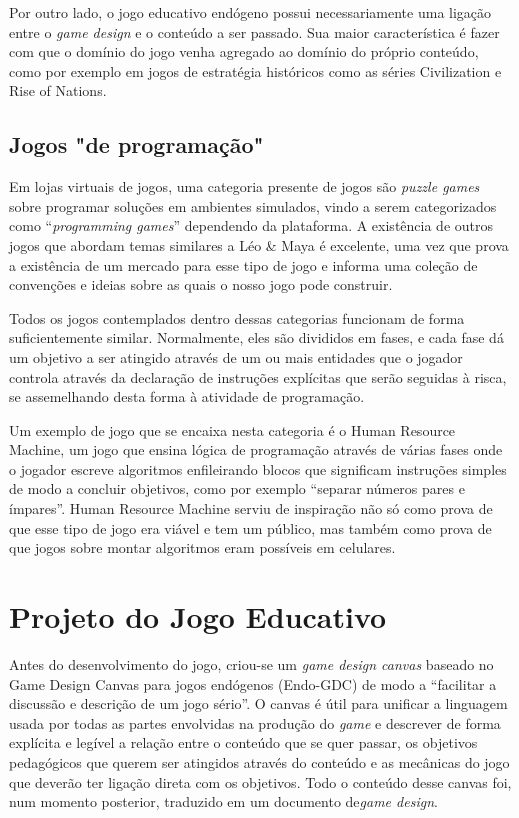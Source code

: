 \documentclass[conference]{IEEEtran}
\begin{document}
Por outro lado, o jogo educativo endógeno possui necessariamente uma ligação entre o \textit{game design} e o conteúdo a ser passado. Sua maior característica é fazer com que o domínio do jogo venha agregado ao domínio do próprio conteúdo, como por exemplo em jogos de estratégia históricos como as séries Civilization e Rise of Nations\cite{b14}.

\subsection{Jogos "de programação"}

Em lojas virtuais de jogos, uma categoria presente de jogos são \textit{puzzle games} sobre programar soluções em ambientes simulados\cite{b15}\cite{b16}, vindo a serem categorizados como “\textit{programming games}” dependendo da plataforma\cite{b17}. A existência de outros jogos que abordam temas similares a Léo \& Maya é excelente, uma vez que prova a existência de um mercado para esse tipo de jogo e informa uma coleção de convenções e ideias sobre as quais o nosso jogo pode construir.

Todos os jogos contemplados dentro dessas categorias funcionam de forma suficientemente similar. Normalmente, eles são divididos em fases, e cada fase dá um objetivo a ser atingido através de um ou mais entidades que o jogador controla através da declaração de instruções explícitas que serão seguidas à risca, se assemelhando desta forma à atividade de programação.

Um exemplo de jogo que se encaixa nesta categoria é o Human Resource Machine\cite{b18}, um jogo que ensina lógica de programação através de várias fases onde o jogador escreve algoritmos enfileirando blocos que significam instruções simples de modo a concluir objetivos, como por exemplo “separar números pares e ímpares”. Human Resource Machine serviu de inspiração não só como prova de que esse tipo de jogo era viável e tem um público, mas também como prova de que jogos sobre montar algoritmos eram possíveis em celulares.

\section{Projeto do Jogo Educativo}
Antes do desenvolvimento do jogo, criou-se um \textit{game design canvas} baseado no Game Design Canvas para jogos endógenos (Endo-GDC) de modo a “facilitar a discussão e descrição de um jogo sério”\cite{b19}. O canvas é útil para unificar a linguagem usada por todas as partes envolvidas na produção do \textit{game} e descrever de forma explícita e legível a relação entre o conteúdo que se quer passar, os objetivos pedagógicos que querem ser atingidos através do conteúdo e as mecânicas do jogo que deverão ter ligação direta com os objetivos. Todo o conteúdo desse canvas foi, num momento posterior, traduzido em um documento de\textit{game design}.
\end{document}
